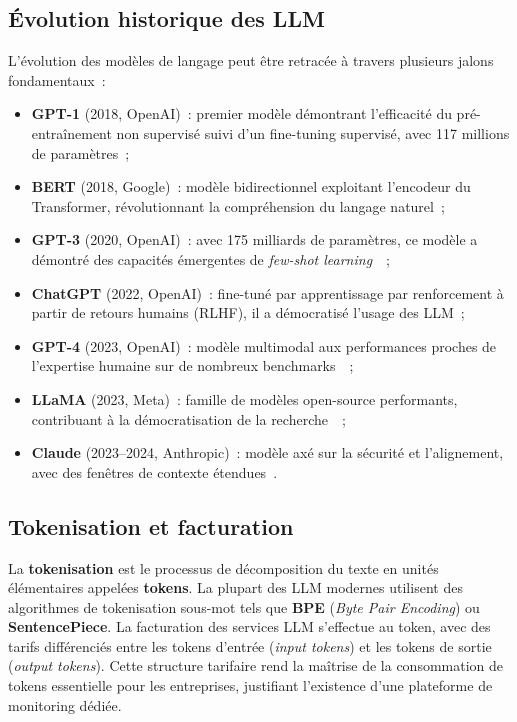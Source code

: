 \subsection{Évolution historique des LLM}

L'évolution des modèles de langage peut être retracée à travers plusieurs jalons fondamentaux~:

\begin{itemize}[noitemsep]
    \item \textbf{GPT-1} (2018, OpenAI)~: premier modèle démontrant l'efficacité du pré-entraînement non supervisé suivi d'un fine-tuning supervisé, avec 117 millions de paramètres~;
    \item \textbf{BERT} (2018, Google)~: modèle bidirectionnel exploitant l'encodeur du Transformer, révolutionnant la compréhension du langage naturel~;
    \item \textbf{GPT-3} (2020, OpenAI)~: avec 175 milliards de paramètres, ce modèle a démontré des capacités émergentes de \textit{few-shot learning}~\cite{brown2020}~;
    \item \textbf{ChatGPT} (2022, OpenAI)~: fine-tuné par apprentissage par renforcement à partir de retours humains (RLHF), il a démocratisé l'usage des LLM~;
    \item \textbf{GPT-4} (2023, OpenAI)~: modèle multimodal aux performances proches de l'expertise humaine sur de nombreux benchmarks~\cite{openai2023}~;
    \item \textbf{LLaMA} (2023, Meta)~: famille de modèles open-source performants, contribuant à la démocratisation de la recherche~\cite{touvron2023}~;
    \item \textbf{Claude} (2023--2024, Anthropic)~: modèle axé sur la sécurité et l'alignement, avec des fenêtres de contexte étendues~\cite{anthropic2024}.
\end{itemize}

\subsection{Tokenisation et facturation}

La \textbf{tokenisation} est le processus de décomposition du texte en unités élémentaires appelées \textbf{tokens}. La plupart des LLM modernes utilisent des algorithmes de tokenisation sous-mot tels que \textbf{BPE} (\textit{Byte Pair Encoding}) ou \textbf{SentencePiece}. La facturation des services LLM s'effectue au token, avec des tarifs différenciés entre les tokens d'entrée (\textit{input tokens}) et les tokens de sortie (\textit{output tokens}). Cette structure tarifaire rend la maîtrise de la consommation de tokens essentielle pour les entreprises, justifiant l'existence d'une plateforme de monitoring dédiée.


